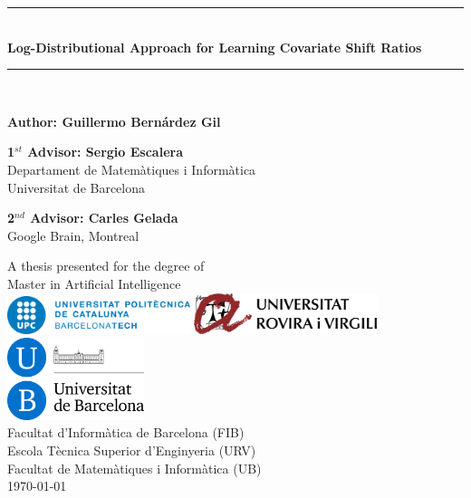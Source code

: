 \documentclass[12pt,a4paper,openright,twoside]{article}
\numberwithin{equation}{section}
\theoremstyle{definition}
\theoremstyle{remark}
\theoremstyle{plain}
\begin{document}
\thispagestyle{empty}

\begin{titlepage}

\begin{center}
	\vspace*{1cm}
	\rule{16cm}{0.2mm}\\
	\vspace*{0.4cm}
	\Huge{\textbf{Log-Distributional Approach for Learning Covariate Shift Ratios}}
	\rule{16cm}{0.2mm}\\
	\vspace{1cm}

	\Large{\textbf{Author: Guillermo Bernárdez Gil}}
\end{center}

\vspace{0.1cm}
\large{
\textbf{1$^{st}$ Advisor: Sergio Escalera}\\
\indent Departament de Matemàtiques i Informàtica \\ 
\indent Universitat de Barcelona

\vspace{8mm}
\textbf{2$^{nd}$ Advisor: Carles Gelada}\\
\indent Google Brain, Montreal \\
}
\vfill

\begin{center}
	\LARGE{A thesis presented for the degree of\\
	Master in Artificial Intelligence} \\
	\vspace{1cm}
	\includegraphics[width=0.4\textwidth]{logo_upc.jpeg}
	\includegraphics[width=0.4\textwidth]{logo_urv}
	\\ 
	\includegraphics[width=4cm]{logo_ub}
	\\
	\large{Facultat d'Informàtica de Barcelona (FIB)} \\
	\large{Escola Tècnica Superior d'Enginyeria (URV)} \\
	\large{Facultat de Matemàtiques i Informàtica (UB)} \\
	\vspace{1cm}
	\Large{\today}
\end{center}

\end{titlepage}
\end{document}

